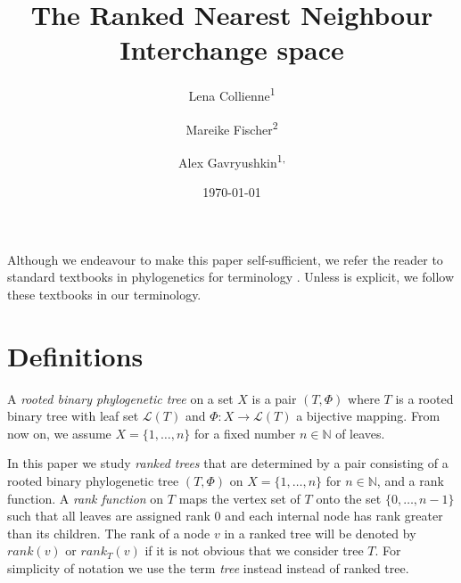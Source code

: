 \documentclass{amsart}
\title{The Ranked Nearest Neighbour Interchange space}
\date{\today}
\author{Lena Collienne\textsuperscript{1}}
\author{Mareike Fischer\textsuperscript{2}}
\author{Alex Gavryushkin\textsuperscript{1, \Letter}}
\begin{document}
\maketitle

\begin{abstract}

\end{abstract}






Although we endeavour to make this paper self-sufficient, we refer the reader to standard textbooks in phylogenetics for terminology \autocite{Felsenstein2004-of, Semple2003-nj, Steel2016-ye}.
Unless is explicit, we follow these textbooks in our terminology.


\section{Definitions}

A \emph{rooted binary phylogenetic tree} on a set $X$ is a pair $(T, \Phi)$ where $T$ is a rooted binary tree with leaf set $\mathcal{L}(T)$ and $\Phi:X \to \mathcal{L}(T)$ a bijective mapping.
From now on, we assume $X = \{1,\ldots,n\}$ for a fixed number $n \in \mathbb N$ of leaves.

In this paper we study \emph{ranked trees} that are determined by a pair consisting of a rooted binary phylogenetic tree $(T, \Phi)$ on $X = \{1, \ldots, n\}$ for $n \in \mathbb N$, and a rank function.
A \emph{rank function} on $T$ maps the vertex set of $T$ onto the set $\{0,\ldots,n-1\}$ such that all leaves are assigned rank $0$ and each internal node has rank greater than its children.
The rank of a node $v$ in a ranked tree will be denoted by $rank(v)$ or $rank_T(v)$ if it is not obvious that we consider tree $T$.
For simplicity of notation we use the term \emph{tree} instead instead of ranked tree.
\end{document}
